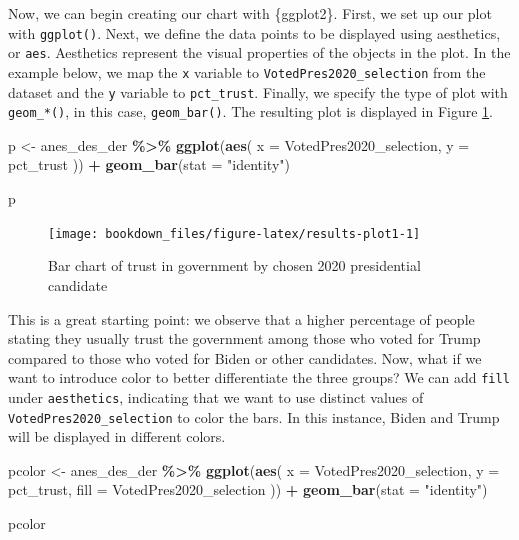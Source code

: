 \documentclass[
]{krantz}
\makeatletter
\newenvironment{Shaded}{\begin{snugshade}}{\end{snugshade}}
\newcommand{\AttributeTok}[1]{\textcolor[rgb]{0.27,0.27,0.27}{#1}}
\newcommand{\FunctionTok}[1]{\textcolor[rgb]{0.27,0.27,0.27}{\textbf{#1}}}
\newcommand{\NormalTok}[1]{#1}
\newcommand{\OtherTok}[1]{\textcolor[rgb]{0.37,0.37,0.37}{#1}}
\newcommand{\SpecialCharTok}[1]{\textcolor[rgb]{0.43,0.43,0.43}{\textbf{#1}}}
\newcommand{\StringTok}[1]{\textcolor[rgb]{0.5,0.5,0.5}{#1}}
\newenvironment{kframe}{%
\medskip{}
\setlength{\fboxsep}{.8em}
 \def\at@end@of@kframe{}%
 \ifinner\ifhmode%
  \def\at@end@of@kframe{\end{minipage}}%
  \begin{minipage}{\columnwidth}%
 \fi\fi%
 \def\FrameCommand##1{\hskip\@totalleftmargin \hskip-\fboxsep
 \colorbox{shadecolor}{##1}\hskip-\fboxsep
     \hskip-\linewidth \hskip-\@totalleftmargin \hskip\columnwidth}%
 \MakeFramed {\advance\hsize-\width
   \@totalleftmargin\z@ \linewidth\hsize
   \@setminipage}}%
 {\par\unskip\endMakeFramed%
 \at@end@of@kframe}
\renewenvironment{Shaded}{\begin{kframe}}{\end{kframe}}
\makeatother
\begin{document}
Now, we can begin creating our chart with \{ggplot2\}. First, we set up our plot with \texttt{ggplot()}. Next, we define the data points to be displayed using aesthetics, or \texttt{aes}. Aesthetics represent the visual properties of the objects in the plot. In the example below, we map the \texttt{x} variable to \texttt{VotedPres2020\_selection} from the dataset and the \texttt{y} variable to \texttt{pct\_trust}. Finally, we specify the type of plot with \texttt{geom\_*()}, in this case, \texttt{geom\_bar()}. The resulting plot is displayed in Figure \ref{fig:results-plot1}.

\begin{Shaded}
\begin{Highlighting}[]
\NormalTok{p }\OtherTok{\textless{}{-}}\NormalTok{ anes\_des\_der }\SpecialCharTok{\%\textgreater{}\%}
  \FunctionTok{ggplot}\NormalTok{(}\FunctionTok{aes}\NormalTok{(}
    \AttributeTok{x =}\NormalTok{ VotedPres2020\_selection,}
    \AttributeTok{y =}\NormalTok{ pct\_trust}
\NormalTok{  )) }\SpecialCharTok{+}
  \FunctionTok{geom\_bar}\NormalTok{(}\AttributeTok{stat =} \StringTok{"identity"}\NormalTok{)}

\NormalTok{p}
\end{Highlighting}
\end{Shaded}

\begin{figure}
\texttt{[image: bookdown\_files/figure-latex/results-plot1-1]} \caption{Bar chart of trust in government by chosen 2020 presidential candidate}\label{fig:results-plot1}
\end{figure}

This is a great starting point: we observe that a higher percentage of people stating they usually trust the government among those who voted for Trump compared to those who voted for Biden or other candidates. Now, what if we want to introduce color to better differentiate the three groups? We can add \texttt{fill} under \texttt{aesthetics}, indicating that we want to use distinct values of \texttt{VotedPres2020\_selection} to color the bars. In this instance, Biden and Trump will be displayed in different colors.

\begin{Shaded}
\begin{Highlighting}[]
\NormalTok{pcolor }\OtherTok{\textless{}{-}}\NormalTok{ anes\_des\_der }\SpecialCharTok{\%\textgreater{}\%}
  \FunctionTok{ggplot}\NormalTok{(}\FunctionTok{aes}\NormalTok{(}
    \AttributeTok{x =}\NormalTok{ VotedPres2020\_selection,}
    \AttributeTok{y =}\NormalTok{ pct\_trust,}
    \AttributeTok{fill =}\NormalTok{ VotedPres2020\_selection}
\NormalTok{  )) }\SpecialCharTok{+}
  \FunctionTok{geom\_bar}\NormalTok{(}\AttributeTok{stat =} \StringTok{"identity"}\NormalTok{)}

\NormalTok{pcolor}
\end{Highlighting}
\end{Shaded}
\end{document}
